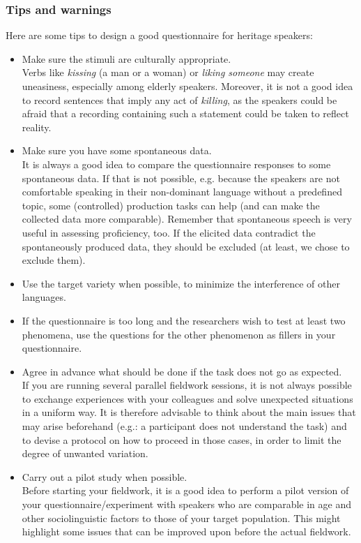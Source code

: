 \documentclass[output=paper,hidelinks]{langscibook}
\begin{document}
\subsubsection{Tips and warnings}

Here are some tips to design a good questionnaire for heritage speakers:
\begin{itemize}
\item Make sure the stimuli are culturally appropriate.\\ 
Verbs like \textit{kissing} (a man or a woman) or \textit{liking someone} may create uneasiness, especially among elderly speakers. Moreover, it is not a good idea to record sentences that imply any act of \textit{killing}, as the speakers could be afraid that a recording containing such a statement could be taken to reflect reality.
\item Make sure you have some spontaneous data.\\
It is always a good idea to compare the questionnaire responses to some spontaneous data. If that is not possible, e.g. because the speakers are not comfortable speaking in their non-dominant language without a predefined topic, some (controlled) production tasks can help (and can make the collected data more comparable). Remember that spontaneous speech is very useful in assessing proficiency, too. If the elicited data contradict the spontaneously produced data, they should be excluded (at least, we chose to exclude them).
\item Use the target variety when possible, to minimize the interference of other languages.
\item If the questionnaire is too long and the researchers wish to test at least two phenomena, use the questions for the other phenomenon as fillers in your questionnaire.
\item Agree in advance what should be done if the task does not go as expected.\\
If you are running several parallel fieldwork sessions, it is not always possible to exchange experiences with your colleagues and solve unexpected situations in a uniform way. It is therefore advisable to think about the main issues that may arise beforehand (e.g.: a participant does not understand the task) and to devise a protocol on how to proceed in those cases, in order to limit the degree of unwanted variation. 
\item Carry out a pilot study when possible.\\
Before starting your fieldwork, it is a good idea to perform a pilot version of your questionnaire/experiment with speakers who are comparable in age and other sociolinguistic factors to those of your target population. This might highlight some issues that can be improved upon before the actual fieldwork.

\end{itemize}
\end{document}
